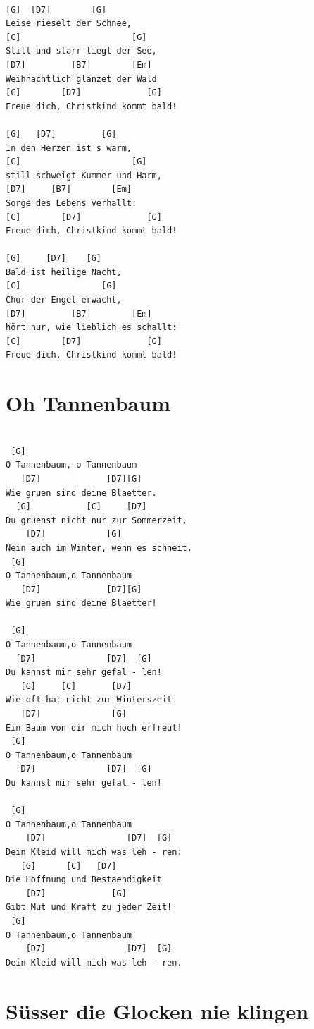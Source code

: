 \documentclass[
]{book}
\let\stdsection\section
\renewcommand\section{\clearpage\stdsection}
\begin{document}
\begin{verbatim}

[G]  [D7]        [G]
Leise rieselt der Schnee,
[C]                      [G]
Still und starr liegt der See,
[D7]         [B7]        [Em]
Weihnachtlich glänzet der Wald
[C]        [D7]             [G]
Freue dich, Christkind kommt bald!

[G]   [D7]         [G]
In den Herzen ist's warm,
[C]                      [G]
still schweigt Kummer und Harm,
[D7]     [B7]        [Em]
Sorge des Lebens verhallt:
[C]        [D7]             [G]
Freue dich, Christkind kommt bald!

[G]     [D7]    [G]
Bald ist heilige Nacht,
[C]                [G]
Chor der Engel erwacht,
[D7]         [B7]        [Em]
hört nur, wie lieblich es schallt:
[C]        [D7]             [G]
Freue dich, Christkind kommt bald!
\end{verbatim}

\hypertarget{oh-tannenbaum}{%
\section{Oh Tannenbaum}\label{oh-tannenbaum}}

\begin{verbatim}

 [G]          
O Tannenbaum, o Tannenbaum
   [D7]             [D7][G]      
Wie gruen sind deine Blaetter.
  [G]           [C]     [D7]     
Du gruenst nicht nur zur Sommerzeit,
    [D7]            [G]     
Nein auch im Winter, wenn es schneit.
 [G]      
O Tannenbaum,o Tannenbaum
   [D7]             [D7][G]     
Wie gruen sind deine Blaetter!
  
 [G]  
O Tannenbaum,o Tannenbaum 
  [D7]              [D7]  [G]      
Du kannst mir sehr gefal - len!
   [G]     [C]       [D7]       
Wie oft hat nicht zur Winterszeit
   [D7]              [G]     
Ein Baum von dir mich hoch erfreut!
 [G]  
O Tannenbaum,o Tannenbaum
  [D7]              [D7]  [G]     
Du kannst mir sehr gefal - len!

 [G]    
O Tannenbaum,o Tannenbaum
    [D7]                [D7]  [G]     
Dein Kleid will mich was leh - ren:
   [G]      [C]   [D7]  
Die Hoffnung und Bestaendigkeit
    [D7]             [G]  
Gibt Mut und Kraft zu jeder Zeit!
 [G]  
O Tannenbaum,o Tannenbaum
    [D7]                [D7]  [G]     
Dein Kleid will mich was leh - ren. 
\end{verbatim}

\hypertarget{suxfcsser-die-glocken-nie-klingen}{%
\section{Süsser die Glocken nie klingen}\label{suxfcsser-die-glocken-nie-klingen}}
\end{document}
